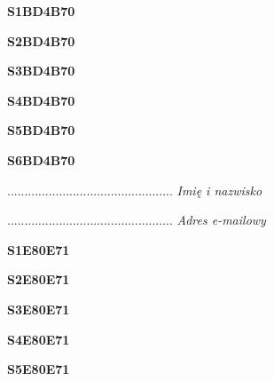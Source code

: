 \begin{turn}{90}\huge \textbf{S1BD4B70}\end{turn}

\begin{turn}{90}\huge \textbf{S2BD4B70}\end{turn}

\begin{turn}{90}\huge \textbf{S3BD4B70}\end{turn}

\begin{turn}{90}\huge \textbf{S4BD4B70}\end{turn}

\begin{turn}{90}\huge \textbf{S5BD4B70}\end{turn}

\begin{turn}{90}\huge \textbf{S6BD4B70}\end{turn}

\begin{turn}{90}\begin{minipage}{\linewidth} \vspace{20mm} ................................................  \textit{Imię i nazwisko}\end{minipage}\end{turn}

\begin{turn}{90}\begin{minipage}{\linewidth} \vspace{20mm} ................................................  \textit{Adres e-mailowy}\end{minipage}\end{turn}

\begin{turn}{90}\huge \textbf{S1E80E71}\end{turn}

\begin{turn}{90}\huge \textbf{S2E80E71}\end{turn}

\begin{turn}{90}\huge \textbf{S3E80E71}\end{turn}

\begin{turn}{90}\huge \textbf{S4E80E71}\end{turn}

\begin{turn}{90}\huge \textbf{S5E80E71}\end{turn}

